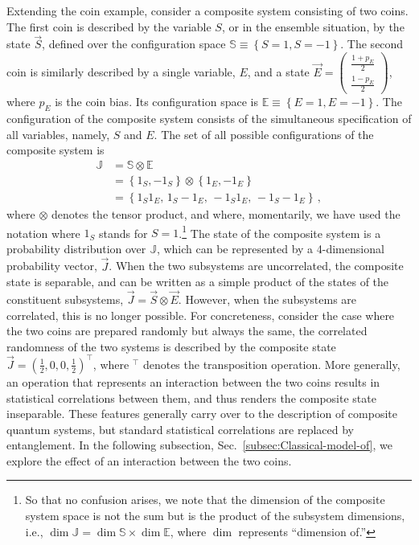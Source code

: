 Extending the coin example, consider a composite system consisting
of two coins. The first coin is described by the variable $S$, or
in the ensemble situation, by the state $\vec{S}$, defined over the
configuration space $\mathbb{S}\equiv\left\{ S=1,S=-1\right\} $.
The second coin is similarly described by a single variable, $E$,
and a state $\vec{E}=\begin{pmatrix}\frac{1+p_{E}}{2}\\
\frac{1-p_{E}}{2}
\end{pmatrix}$, where $p_{E}$ is the coin bias. Its configuration space is $\mathbb{E}\equiv\left\{ E=1,E=-1\right\} $.
The configuration of the composite system consists of the simultaneous
specification of all variables, namely, $S$ and $E$. The set of
all possible configurations of the composite system is
\begin{align}
\mathbb{J} & =\mathbb{S}\otimes\mathbb{E}\label{eq:compsite-sys}\\
 & =\left\{ 1_{S},-1_{S}\right\} \otimes\left\{ 1_{E},-1_{E}\right\} \nonumber \\
 & =\left\{ 1_{S}1_{E},\,1_{S}-1_{E},\,-1_{S}1_{E},\,-1_{S}-1_{E}\right\} \,,\nonumber 
\end{align}
where $\otimes$ denotes the tensor product, and where, momentarily,
we have used the notation where $1_{S}$ stands for $S=1$.\footnote{So that no confusion arises, we note that the dimension of the composite
system space is not the sum but is the product of the subsystem dimensions,
i.e., $\dim\mathbb{J}=\dim\mathbb{S}\times\dim\mathbb{E}$, where
$\dim$ represents ``dimension of.''} The state of the composite system is a probability distribution over
$\mathbb{J}$, which can be represented by a 4-dimensional probability
vector, $\vec{J}$. When the two subsystems are uncorrelated, the
composite state is separable, and can be written as a simple product
of the states of the constituent subsystems, $\vec{J}=\vec{S}\otimes\vec{E}$.
However, when the subsystems are correlated, this is no longer possible.
For concreteness, consider the case where the two coins are prepared
randomly but always the same, the correlated randomness of the two
systems is described by the composite state  $\vec{J}=\left(\frac{1}{2},0,0,\frac{1}{2}\right)^{\intercal}$,
where $^{\intercal}$ denotes the transposition operation. More generally,
an operation that represents an interaction between the two coins
results in statistical correlations between them, and thus renders
the composite state inseparable. These features generally carry over
to the description of composite quantum systems, but standard statistical
correlations are replaced by entanglement. In the following subsection,
Sec.~\ref{subsec:Classical-model-of}, we explore the effect of an
interaction between the two coins.

